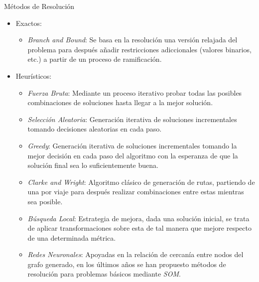 \documentclass[8pt]{beamer}
\begin{document}
  \begin{frame}{Métodos de Resolución}
    \begin{itemize}
      \item Exactos:
        \begin{itemize}
          \item \emph{Branch and Bound}: Se basa en la resolución una versión relajada del problema para después añadir restricciones adiccionales (valores binarios, etc.) a partir de un proceso de ramificación.
        \end{itemize}
      \item Heurísticos:
        \begin{itemize}
          \item \emph{Fuerza Bruta}: Mediante un proceso iterativo probar todas las posibles combinaciones de soluciones hasta llegar a la mejor solución.
          \item \emph{Selección Aleatoria}: Generación iterativa de soluciones incrementales tomando decisiones aleatorias en cada paso.
          \item \emph{Greedy}: Generación iterativa de soluciones incrementales tomando la mejor decisión en cada paso del algoritmo con la esperanza de que la solución final sea lo suficientemente buena.
          \item \emph{Clarke and Wright}: Algoritmo clásico de generación de rutas, partiendo de una por viaje para después realizar combinaciones entre estas mientras sea posible.
          \item \emph{Búsqueda Local}: Estrategia de mejora, dada una solución inicial, se trata de aplicar transformaciones sobre esta de tal manera que mejore respecto de una determinada métrica.
          \item \emph{Redes Neuronales}: Apoyadas en la relación de cercanía entre nodos del grafo generado, en los últimos años se han propuesto métodos de resolución para problemas básicos mediante \emph{SOM}.
        \end{itemize}
    \end{itemize}
  \end{frame}
\end{document}
